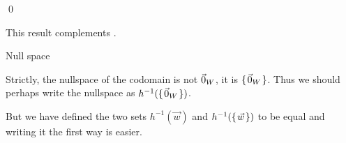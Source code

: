 \documentclass[10pt,t]{beamer}
\begin{document}
\begin{frame}
\lm[le:NullspIsSubSp]

\pause
\pf
{}
\qed

\pause
\medskip
\no
This result complements .
\end{frame}




\begin{frame}{Null space}
\df[df:NullSpace]

\pause
\no 
Strictly, the nullspace of the codomain is not $\vec{0}_{W}$, it is 
$\mbox{$\{\hspace{0.1em}\vec{0}_{W}\hspace{0.1em}\}$}$.
Thus we should perhaps write the nullspace 
as $h^{-1}(\mbox{$\{\hspace{0.1em}\vec{0}_{W}\hspace{0.1em}\}$})$.

But we have defined the two sets $h^{-1}(\vec{w})$
and $h^{-1}(\mbox{$\{\hspace{0.1em}\vec{w}\hspace{0.1em}\}$})$ to be equal
and writing it the first way is easier.
\end{frame}
\end{document}
